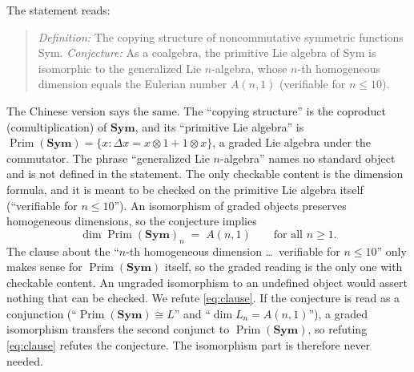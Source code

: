 \documentclass[11pt]{article}
\theoremstyle{remark}
\newcommand{\NSym}{\mathbf{Sym}}
\newcommand{\Prim}{\operatorname{Prim}}
\begin{document}
The statement reads:
\begin{quote}
\emph{Definition:} The copying structure of noncommutative symmetric
functions Sym. \emph{Conjecture:} As a coalgebra, the primitive Lie algebra of
Sym is isomorphic to the generalized Lie $n$-algebra, whose $n$-th homogeneous
dimension equals the Eulerian number $A(n,1)$ (verifiable for $n\le10$).
\end{quote}
The Chinese version says the same. The ``copying structure'' is the coproduct
(comultiplication) of $\NSym$, and its ``primitive Lie algebra'' is
$\Prim(\NSym)=\{x:\Delta x=x\otimes1+1\otimes x\}$, a graded Lie algebra
under the commutator. The phrase ``generalized Lie $n$-algebra'' names no
standard object and is not defined in the statement. The only checkable
content is the dimension formula, and it is meant to be checked on the
primitive Lie algebra itself (``verifiable for $n\le10$''). An isomorphism of graded
objects preserves homogeneous dimensions, so the conjecture implies
\begin{equation}\label{eq:clause}
\dim \Prim(\NSym)_n \;=\; A(n,1)\qquad\text{for all } n\ge1 .
\end{equation}
The clause about the ``$n$-th homogeneous dimension \dots\ verifiable for $n\le10$''
only makes sense for $\Prim(\NSym)$ itself, so the graded reading is the only one
with checkable content. An ungraded isomorphism to an undefined object would assert
nothing that can be checked. We refute \eqref{eq:clause}. If the conjecture is read as a conjunction
(``$\Prim(\NSym)\cong L$'' and ``$\dim L_n=A(n,1)$''), a graded isomorphism
transfers the second conjunct to $\Prim(\NSym)$, so refuting
\eqref{eq:clause} refutes the conjecture. The isomorphism part is therefore never
needed.
\end{document}
